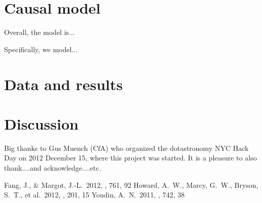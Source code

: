 \documentclass[12pt, preprint]{aastex}
\begin{document}
\section{Causal model}

Overall, the model is...

Specifically, we model...  

\section{Data and results}

\section{Discussion}

\acknowledgements Big thanks to Gus Muench (CfA) who organized the
dotastronomy NYC Hack Day on 2012 December 15, where this project was
started.  It is a pleasure to also thank....and acknowledge....etc.

\begin{thebibliography}{70}
\raggedright
{}
Fang, J., \& Margot, J.-L.\ 2012, \apj, 761, 92
Howard, A.~W., Marcy, G.~W., Bryson, S.~T., et al.\ 2012, \apjs, 201, 15
Youdin, A.~N.\ 2011, \apj, 742, 38
\end{thebibliography}
\end{document}
